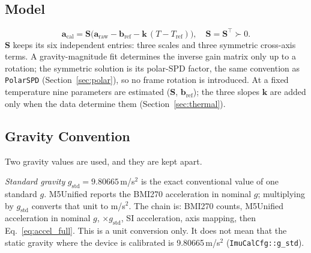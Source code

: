 \documentclass[conference]{IEEEtran}
\begin{document}
    \subsection{Model}

    \begin{equation}
        \mathbf{a}_\text{cal} = \mathbf{S}\bigl(\mathbf{a}_\text{raw}
        - \mathbf{b}_\text{ref} - \mathbf{k}\,(T - T_\text{ref})\bigr),
        \quad \mathbf{S} = \mathbf{S}^\top \succ 0.
        \label{eq:accel_full}
    \end{equation}
    $\mathbf{S}$ keeps its six independent entries: three scales and three
    symmetric cross-axis terms. A gravity-magnitude fit determines the
    inverse gain matrix only up to a rotation; the symmetric solution is its
    polar-SPD factor, the same convention as \texttt{PolarSPD}
    (Section~\ref{sec:polar}), so no frame rotation is introduced.
    At a fixed temperature nine parameters are estimated
    ($\mathbf{S}$, $\mathbf{b}_\text{ref}$); the three slopes $\mathbf{k}$
    are added only when the data determine them (Section~\ref{sec:thermal}).

    \subsection{Gravity Convention}
    \label{sec:gravity}

    Two gravity values are used, and they are kept apart.

    \emph{Standard gravity} $g_\text{std} = 9.80665$\,m/s$^2$ is the exact
    conventional value of one standard $g$. M5Unified reports the BMI270
    acceleration in nominal $g$; multiplying by $g_\text{std}$ converts that
    unit to m/s$^2$. The chain is: BMI270 counts, M5Unified acceleration in
    nominal $g$, $\times g_\text{std}$, SI acceleration, axis mapping,
    then Eq.~\eqref{eq:accel_full}. This is a unit conversion only. It does
    not mean that the static gravity where the device is calibrated is
    9.80665\,m/s$^2$ (\texttt{ImuCalCfg::g\_std}).
\end{document}
